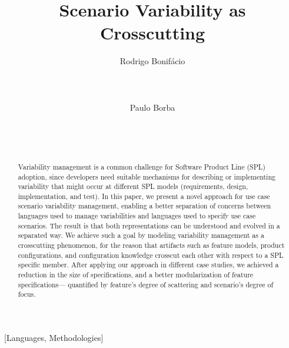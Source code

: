 \documentclass{acm_proc_article-sp}
\begin{document}
\lstset{language=Haskell, numbers=left,
numberstyle=\tiny,numbersep=5pt,basicstyle=\scriptsize,aboveskip=20pt}

\title{Scenario Variability as Crosscutting}



\author{
\alignauthor
Rodrigo Bonif\'{a}cio\\
       \\
       \\
       \\
\alignauthor
Paulo Borba\\
       \\
       \\
       \\
}

\maketitle

\begin{abstract}
Variability management is a common challenge for Software Product
Line (SPL) adoption, since developers need suitable
mechanisms for describing or implementing variability
that might occur at different SPL models (requirements, design,
implementation, and test). In this paper, we present a novel approach for
use case scenario variability management, enabling a better
separation of concerns between languages used to manage
variabilities and languages used to specify use case scenarios. The
result is that both representations can be understood and evolved in
a separated way. We achieve such a goal by modeling variability management
as a crosscutting phenomenon, for the reason that artifacts such as feature models,
product configurations, and configuration knowledge crosscut each
other with respect to a SPL specific member. After applying our approach in
different case studies, we achieved a reduction in the size of specifications,
and a better modularization of feature specifications--- quantified
by feature's degree of scattering and scenario's degree of focus.
\end{abstract}

[Languages,
Methodologies]\




%
%



\end{document}
